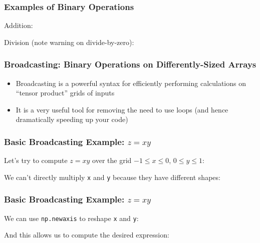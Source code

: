 \documentclass[xcolor={x11names,table}]{beamer}
\begin{document}
\begin{frame}
	\frametitle{Examples of Binary Operations}
	
	Addition:
	
	Division (note warning on divide-by-zero):
	
\end{frame}

\begin{frame}
	\frametitle{Broadcasting: Binary Operations on Differently-Sized Arrays}
	\begin{itemize}
		\item Broadcasting is a powerful syntax for efficiently performing calculations on ``tensor product'' grids of inputs
		\item It is a very useful tool for removing the need to use loops (and hence dramatically speeding up your code)
	\end{itemize}
\end{frame}

\begin{frame}
	\frametitle{Basic Broadcasting Example: $z=xy$}
	Let's try to compute $z=xy$ over the grid $-1\leq x\leq 0$, $0\leq y\leq 1$:
	
	We can't directly multiply \texttt{x} and \texttt{y} because they have different shapes:
	
	
\end{frame}

\begin{frame}
	\frametitle{Basic Broadcasting Example: $z=xy$}
	
	We can use \texttt{np.newaxis} to reshape \texttt{x} and \texttt{y}:
	
	And this allows us to compute the desired expression:
	
\end{frame}
\end{document}
